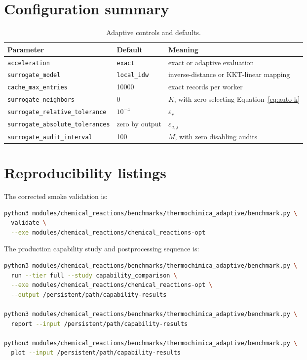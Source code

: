 \documentclass[11pt]{article}
\newcommand{\code}[1]{\texttt{#1}}
\begin{document}
\appendix
\section{Configuration summary}

\begin{table}[htbp]
  \centering
  \caption{Adaptive controls and defaults.}
  \begin{tabular}{lll}
    \toprule
    Parameter & Default & Meaning \\
    \midrule
    \code{acceleration} & \code{exact} & exact or adaptive evaluation \\
    \code{surrogate\_model} & \code{local\_idw} & inverse-distance or KKT-linear mapping \\
    \code{cache\_max\_entries} & 10000 & exact records per worker \\
    \code{surrogate\_neighbors} & 0 & $K$, with zero selecting Equation~\eqref{eq:auto-k} \\
    \code{surrogate\_relative\_tolerance} & $10^{-4}$ & $\varepsilon_r$ \\
    \code{surrogate\_absolute\_tolerances} & zero by output & $\varepsilon_{a,j}$ \\
    \code{surrogate\_audit\_interval} & 100 & $M$, with zero disabling audits \\
    \bottomrule
  \end{tabular}
\end{table}

\section{Reproducibility listings}

The corrected smoke validation is:
\begin{lstlisting}[language=bash,caption={Functional validation of the benchmark workflow.}]
python3 modules/chemical_reactions/benchmarks/thermochimica_adaptive/benchmark.py \
  validate \
  --exe modules/chemical_reactions/chemical_reactions-opt
\end{lstlisting}

The production capability study and postprocessing sequence is:
\begin{lstlisting}[language=bash,caption={Full capability campaign and report generation.}]
python3 modules/chemical_reactions/benchmarks/thermochimica_adaptive/benchmark.py \
  run --tier full --study capability_comparison \
  --exe modules/chemical_reactions/chemical_reactions-opt \
  --output /persistent/path/capability-results

python3 modules/chemical_reactions/benchmarks/thermochimica_adaptive/benchmark.py \
  report --input /persistent/path/capability-results

python3 modules/chemical_reactions/benchmarks/thermochimica_adaptive/benchmark.py \
  plot --input /persistent/path/capability-results
\end{lstlisting}
\end{document}
